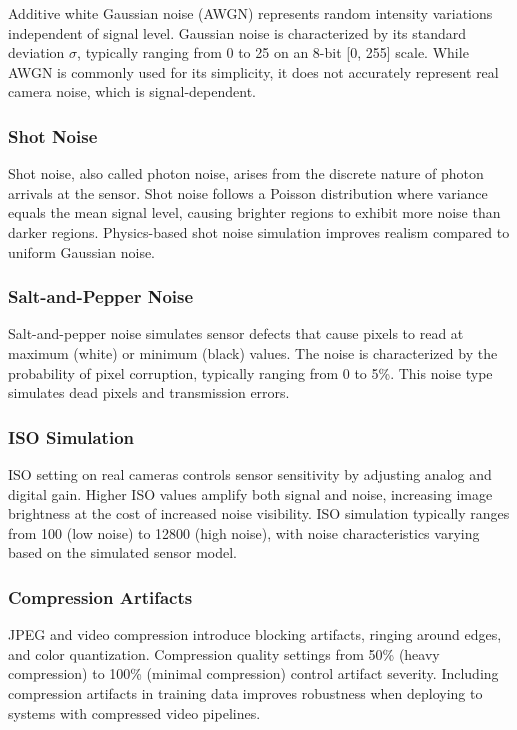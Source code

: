 Additive white Gaussian noise (AWGN) represents random intensity variations independent of signal level. Gaussian noise is characterized by its standard deviation $\sigma$, typically ranging from 0 to 25 on an 8-bit [0, 255] scale. While AWGN is commonly used for its simplicity, it does not accurately represent real camera noise, which is signal-dependent.

\subsubsection{Shot Noise}

Shot noise, also called photon noise, arises from the discrete nature of photon arrivals at the sensor. Shot noise follows a Poisson distribution where variance equals the mean signal level, causing brighter regions to exhibit more noise than darker regions. Physics-based shot noise simulation improves realism compared to uniform Gaussian noise.

\subsubsection{Salt-and-Pepper Noise}

Salt-and-pepper noise simulates sensor defects that cause pixels to read at maximum (white) or minimum (black) values. The noise is characterized by the probability of pixel corruption, typically ranging from 0 to 5\%. This noise type simulates dead pixels and transmission errors.

\subsubsection{ISO Simulation}

ISO setting on real cameras controls sensor sensitivity by adjusting analog and digital gain. Higher ISO values amplify both signal and noise, increasing image brightness at the cost of increased noise visibility. ISO simulation typically ranges from 100 (low noise) to 12800 (high noise), with noise characteristics varying based on the simulated sensor model.

\subsubsection{Compression Artifacts}

JPEG and video compression introduce blocking artifacts, ringing around edges, and color quantization. Compression quality settings from 50\% (heavy compression) to 100\% (minimal compression) control artifact severity. Including compression artifacts in training data improves robustness when deploying to systems with compressed video pipelines.

